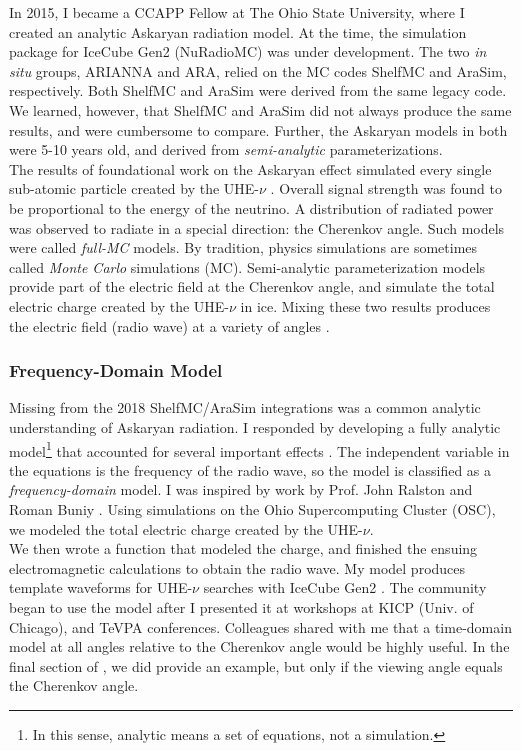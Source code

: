 \documentclass[../../../main.tex]{subfiles}
\begin{document}
In 2015, I became a CCAPP Fellow at The Ohio State University, where I created an analytic Askaryan radiation model.  At the time, the simulation package for IceCube Gen2 (NuRadioMC) was under development.  The two \textit{in situ} groups, ARIANNA and ARA, relied on the MC codes ShelfMC and AraSim, respectively.  Both ShelfMC and AraSim were derived from the same legacy code.  We learned, however, that ShelfMC and AraSim did not always produce the same results, and were cumbersome to compare.  Further, the Askaryan models in both were 5-10 years old, and derived from \textit{semi-analytic} parameterizations.
\\
\vspace{0.15cm}
The results of foundational work on the Askaryan effect simulated every single sub-atomic particle created by the UHE-$\nu$ \cite{zhs}.  Overall signal strength was found to be proportional to the energy of the neutrino.  A distribution of radiated power was observed to radiate in a special direction: the Cherenkov angle.  Such models were called \textit{full-MC} models.  By tradition, physics simulations are sometimes called \textit{Monte Carlo} simulations (MC).  Semi-analytic parameterization models provide part of the electric field at the Cherenkov angle, and simulate the total electric charge created by the UHE-$\nu$ in ice.  Mixing these two results produces the electric field (radio wave) at a variety of angles \cite{PhysRevD.101.083005}.

\subsubsection{Frequency-Domain Model}

Missing from the 2018 ShelfMC/AraSim integrations was a common analytic understanding of Askaryan radiation.  I responded by developing a fully analytic model\footnote{In this sense, analytic means a set of equations, not a simulation.} that accounted for several important effects \cite{10.1016/j.astropartphys.2017.03.008}.  The independent variable in the equations is the frequency of the radio wave, so the model is classified as a \textit{frequency-domain} model.  I was inspired by work by Prof. John Ralston and Roman Buniy \cite{10.1103/physrevd.65.016003}.  Using simulations on the Ohio Supercomputing Cluster (OSC), we modeled the total electric charge created by the UHE-$\nu$.
\\
\vspace{0.15cm}
We then wrote a function that modeled the charge, and finished the ensuing electromagnetic calculations to obtain the radio wave.  My model produces template waveforms for UHE-$\nu$ searches with IceCube Gen2 \cite{10.1016/j.astropartphys.2017.03.008}.  The community began to use the model after I presented it at workshops at KICP (Univ. of Chicago), and TeVPA conferences.  Colleagues shared with me that a time-domain model at all angles relative to the Cherenkov angle would be highly useful.  In the final section of \cite{10.1016/j.astropartphys.2017.03.008}, we did provide an example, but only if the viewing angle equals the Cherenkov angle.
\end{document}
